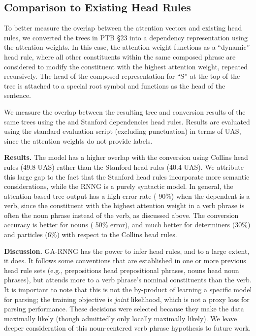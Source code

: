 \documentclass[11pt]{article}
\newcommand{\miguelcomment}[1]{\textcolor{red}{{\textbf{[#1 --\textsc{miguel}]}}}}
\renewcommand{\miguelcomment}[1]{}
\begin{document}
\subsection{Comparison to Existing Head Rules}

To better measure the overlap between the attention vectors and existing head rules, we converted the trees in PTB \S23 into a dependency representation using the attention weights. In this case, the attention weight functions as a ``dynamic'' head rule, where all other constituents within the same composed phrase are considered to modify the constituent with the highest attention weight, repeated recursively. The head of the composed representation for ``S'' at the top of the tree is attached to a special root symbol and functions as the head of the sentence. \miguelcomment{Also, see my comments about Stanford, Collins and Johansson's above... it seems that we are probably more similar to Johansson's. I sent the conversion tool months ago. Not sure if there is time to evaluate there.}

We measure the overlap between the resulting tree and conversion results of the same trees using the  and Stanford dependencies \cite{demarneffe-06} head rules. Results are evaluated using the standard evaluation script (excluding punctuation) in terms of UAS, since the attention weights do not provide labels.

\textbf{Results.} The model has a higher overlap with the conversion using Collins head rules (49.8 UAS) rather than the Stanford head rules (40.4 UAS). We attribute this large gap to the fact that the Stanford head rules incorporate more semantic considerations, while the RNNG is a purely syntactic model. In general, the attention-based tree output has a high error rate ( 90\%) when the dependent is a verb, since the constituent with the highest attention weight in a verb phrase is often the noun phrase instead of the verb, as discussed above. The conversion accuracy is better for nouns ( 50\% error), and much better for determiners (30\%) and particles (6\%) with respect to the Collins head rules.

\textbf{Discussion.}  GA-RNNG has the power to infer head rules, and to a large extent, it does.  It follows some conventions that are established in one or more previous head rule sets (e.g., prepositions head prepositional phrases, nouns head noun phrases), but attends more to a verb phrase's nominal constituents than the verb.  It is important to note that this is not the by-product of learning a specific model for parsing; the training objective is \emph{joint} likelihood, which is not a proxy loss for parsing performance.  These decisions were selected because they make the data maximally likely (though admittedly only locally maximally likely).  We leave deeper consideration of this noun-centered verb phrase hypothesis to future work.
\end{document}

